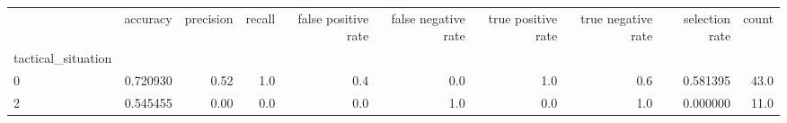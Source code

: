 \begin{tabular}{lrrrrrrrrr}
\toprule
{} &  accuracy &  precision &  recall &  false positive rate &  false negative rate &  true positive rate &  true negative rate &  selection rate &  count \\
tactical\_situation &           &            &         &                      &                      &                     &                     &                 &        \\
\midrule
0                  &  0.720930 &       0.52 &     1.0 &                  0.4 &                  0.0 &                 1.0 &                 0.6 &        0.581395 &   43.0 \\
2                  &  0.545455 &       0.00 &     0.0 &                  0.0 &                  1.0 &                 0.0 &                 1.0 &        0.000000 &   11.0 \\
\bottomrule
\end{tabular}

